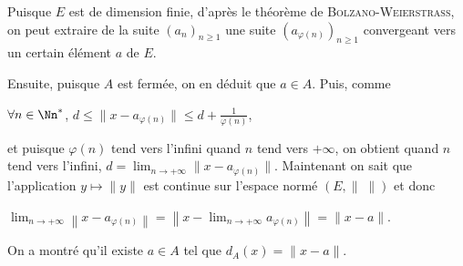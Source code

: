 {\begin{enumerate}
{Puisque $E$ est de dimension finie, d'après le théorème de \textsc{Bolzano}-\textsc{Weierstrass},  on peut extraire de la suite $(a_n)_{n\geqslant1}$ une suite $(a_{\varphi(n)})_{n\geqslant1}$ convergeant vers un certain élément $a$ de $E$.

Ensuite, puisque $A$ est fermée, on en déduit que $a\in A$. Puis, comme

\begin{center}
$\forall n\in\Nn^*$, $d\leqslant\|x-a_{\varphi(n)}\| \leqslant d+ \frac{1}{\varphi(n)}$,
\end{center}

et puisque $\varphi(n)$ tend vers l'infini quand $n$ tend vers $+\infty$, on obtient quand $n$ tend vers l'infini, $d =\lim_{n \rightarrow +\infty}\|x-a_{\varphi(n)}\|$. Maintenant on sait que l'application $y\mapsto\|y\|$ est continue sur l'espace normé $(E,\|\;\|)$ et donc 

\begin{center}
$\lim_{n \rightarrow +\infty}\left\|x-a_{\varphi(n)}\right\|=\left\|x-\lim_{n \rightarrow +\infty}a_{\varphi(n)}\right\|=\|x-a\|$.
\end{center}

On a montré qu'il existe $a\in A$ tel que $d_A(x)=\|x-a\|$.}
\end{enumerate}
}
